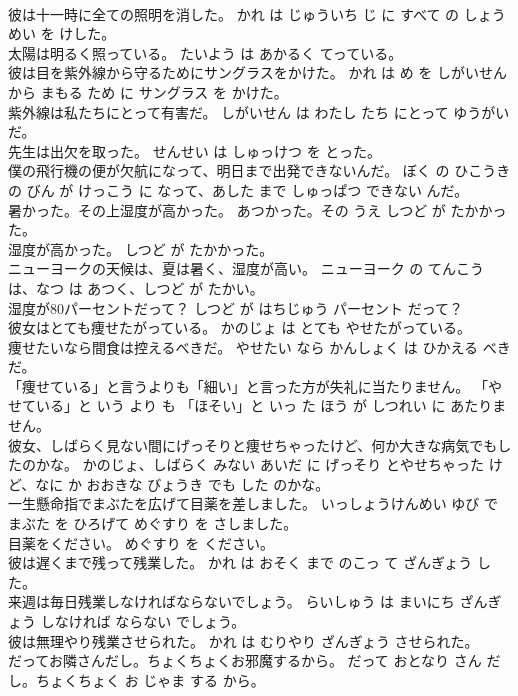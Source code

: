 \documentclass[8pt]{extreport}
\begin{document}
\begin{CJK}{UTF8}{min}
\\	彼は十一時に全ての照明を消した。	かれ は じゅういち じ に すべて の しょうめい を けした。	
\\	太陽は明るく照っている。	たいよう は あかるく てっている。	
\\	彼は目を紫外線から守るためにサングラスをかけた。	かれ は め を しがいせん から まもる ため に サングラス を かけた。	
\\	紫外線は私たちにとって有害だ。	しがいせん は わたし たち にとって ゆうがい だ。	
\\	先生は出欠を取った。	せんせい は しゅっけつ を とった。	
\\	僕の飛行機の便が欠航になって、明日まで出発できないんだ。	ぼく の ひこうき の びん が けっこう に なって、あした まで しゅっぱつ できない んだ。	
\\	暑かった。その上湿度が高かった。	あつかった。その うえ しつど が たかかった。	
\\	湿度が高かった。	しつど が たかかった。	
\\	ニューヨークの天候は、夏は暑く、湿度が高い。	ニューヨーク の てんこう は、なつ は あつく、しつど が たかい。	
\\	湿度が80パーセントだって？	しつど が はちじゅう パーセント だって？	
\\	彼女はとても痩せたがっている。	かのじょ は とても やせたがっている。	
\\	痩せたいなら間食は控えるべきだ。	やせたい なら かんしょく は ひかえる べき だ。	
\\	「痩せている」と言うよりも「細い」と言った方が失礼に当たりません。	「やせている」と いう より も 「ほそい」と いっ た ほう が しつれい に あたりません。	
\\	彼女、しばらく見ない間にげっそりと痩せちゃったけど、何か大きな病気でもしたのかな。	かのじょ、しばらく みない あいだ に げっそり とやせちゃった けど、なに か おおきな びょうき でも した のかな。	
\\	一生懸命指でまぶたを広げて目薬を差しました。	いっしょうけんめい ゆび で まぶた を ひろげて めぐすり を さしました。	
\\	目薬をください。	めぐすり を ください。	
\\	彼は遅くまで残って残業した。	かれ は おそく まで のこっ て ざんぎょう した。	
\\	来週は毎日残業しなければならないでしょう。	らいしゅう は まいにち ざんぎょう しなければ ならない でしょう。	
\\	彼は無理やり残業させられた。	かれ は むりやり ざんぎょう させられた。	
\\	だってお隣さんだし。ちょくちょくお邪魔するから。	だって おとなり さん だ し。ちょくちょく お じゃま する から。	

\end{CJK}
\end{document}
